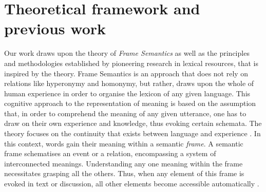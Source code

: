 \documentclass[output=paper,colorlinks,citecolor=brown]{langscibook}
\begin{document}
\section{Theoretical framework and previous work}
\label{sec:background}
Our work draws upon the theory of {\em{Frame Semantics}} \citep{fillmore_1976,fillmore_1977,fillmore_1982,fillmore_1985} as well as the principles and methodologies established by pioneering research in lexical resources, that is inspired by the theory. Frame Semantics is an approach that does not rely on relations like hyperonymy and homonymy, but rather, draws upon the whole of human experience in order to organise the lexicon of any given language. This cognitive approach to the representation of meaning is based on the assumption that, in order to comprehend the meaning of any given utterance, one has to draw on their own experience and knowledge, thus evoking certain schemata. %
The theory focuses on the continuity that exists between language and experience \citep{petruck_1997}. In this context, words gain their meaning within a semantic {\em{frame}}. %
A semantic frame schematises an event or a relation, encompassing a system of interconnected meanings. Understanding any one meaning within the frame necessitates grasping all the others. Thus, when any element of this frame is evoked in text or discussion, all other elements become accessible automatically \citep{fillmore_1982}.
\end{document}
